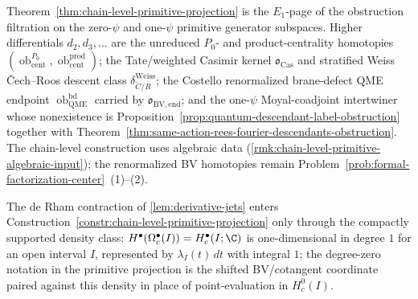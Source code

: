 \begin{rmk}\label{rmk:T5-primitive-shadow-scope}
  Theorem~\ref{thm:chain-level-primitive-projection} is the
  \(E_1\)-page of the obstruction filtration on the zero-\(\psi\) and
  one-\(\psi\) primitive generator subspaces.  Higher differentials
  \(d_2,d_3,\ldots\) are the unreduced \(P_0\)- and product-centrality
  homotopies
  \((\operatorname{ob}_{\mathrm{cent}}^{P_0},
     \operatorname{ob}_{\mathrm{cent}}^{\mathrm{prod}})\); the
  Tate/weighted Casimir kernel
  \(\mathfrak o_{\mathrm{Cas}}\) and stratified Weiss \v{C}ech--Roos
  descent class \(\delta_{\check C/R}^{\mathrm{Weiss}}\); the
  Costello renormalized brane-defect QME endpoint
  \(\operatorname{ob}_{\mathrm{QME}}^{\mathrm{bd}}\) carried by
  \(\mathfrak o_{\mathrm{BV,end}}\); and the one-\(\psi\)
	  Moyal-coadjoint intertwiner whose nonexistence is
	  Proposition~\ref{prop:quantum-descendant-label-obstruction} together
	  with Theorem~\ref{thm:same-action-rees-fourier-descendants-obstruction}.  The
	  chain-level construction uses algebraic data
	  (\ref{rmk:chain-level-primitive-algebraic-input}); the renormalized BV homotopies
  remain Problem~\ref{prob:formal-factorization-center}~(1)--(2).
\end{rmk}

\begin{rmk}\label{rmk:role-of-deRham-contraction}
  The de Rham contraction of \ref{lem:derivative-jets} enters
  Construction~\ref{constr:chain-level-primitive-projection} only
  through the compactly supported density class:
  \(H^\bullet(\Omega^\bullet_c(I))=H^\bullet_c(I;\C)\) is one-dimensional
  in degree \(1\) for an open interval \(I\), represented by
	  \(\lambda_I(t)\,dt\) with integral \(1\); the degree-zero notation in
	  the primitive projection is the shifted BV/cotangent coordinate paired
	  against this density in place of point-evaluation in \(H_c^0(I)\).
\end{rmk}
